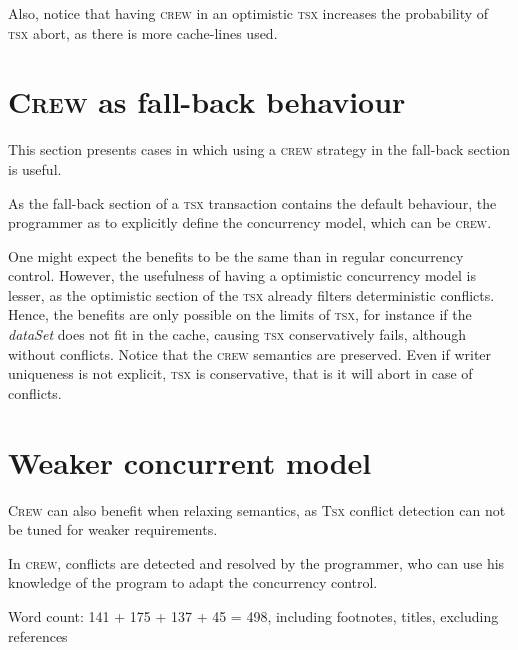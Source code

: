 \documentclass[twocolumn]{article}
\begin{document}
Also, notice that having \textsc{crew} in an optimistic \textsc{tsx} increases the probability of \textsc{tsx} abort, as there is more cache-lines used.

\section{\textsc{Crew} as fall-back behaviour}
\label{sec:fallback}
This section presents cases in which using a \textsc{crew} strategy in the fall-back section is useful.

As the fall-back section of a \textsc{tsx} transaction contains the default behaviour, the programmer as to explicitly define the concurrency model, which can be \textsc{crew}.

One might expect the benefits to be the same than in regular concurrency control. However, the usefulness of having a optimistic concurrency model is lesser, as the optimistic section of the \textsc{tsx} already filters deterministic conflicts. Hence, the benefits are only possible on the limits of \textsc{tsx}, for instance if the \emph{dataSet} does not fit in the cache, causing \textsc{tsx} conservatively fails, although without conflicts.
Notice that the \textsc{crew} semantics are preserved. Even if writer uniqueness is not explicit, \textsc{tsx} is conservative, that is it will abort in case of conflicts.

\section{Weaker concurrent model}
\label{sec:relax}
\textsc{Crew} can also benefit when relaxing semantics, as \textsc{Tsx} conflict detection can not be tuned for weaker requirements.

In \textsc{crew}, conflicts are detected and resolved by the programmer, who can use his knowledge of the program to adapt the concurrency control. 

\vfill

{\color{gray} \noindent Word count: 141 + 175 + 137 + 45 = 498, including footnotes, titles, excluding references}
\end{document}
